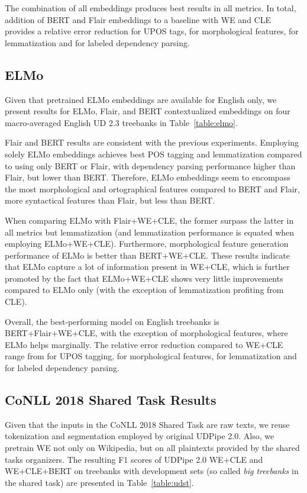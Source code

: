 \documentclass[11pt,a4paper]{article}
\begin{document}
The combination of all embeddings produces best results in all metrics.
In total, addition of BERT and Flair
embeddings to a baseline with WE and CLE provides a  relative error
reduction for UPOS tags,  for morphological features,  for
lemmatization and  for labeled dependency parsing.

\subsection{ELMo}

Given that pretrained ELMo embeddings are available for English only,
we present results for ELMo, Flair, and BERT contextualized embeddings on four
macro-averaged English UD 2.3 treebanks in Table~\ref{table:elmo}.


Flair and BERT results are consistent with the previous experiments.
Employing solely ELMo embeddings
achieves best POS tagging and lemmatization compared to using only BERT or Flair, with dependency
parsing performance higher than Flair, but lower than BERT. Therefore,
ELMo embeddings seem to encompass the most morphological and ortographical features
compared to BERT and Flair, more syntactical features than Flair, but less
than BERT.

When comparing ELMo with Flair+WE+CLE, the former surpass the latter in all
metrics but lemmatization (and lemmatization performance is equated when
employing ELMo+WE+CLE). Furthermore, morphological feature generation performance
of ELMo is better than BERT+WE+CLE. These results indicate that ELMo capture
a lot of information present in WE+CLE, which is further promoted
by the fact that ELMo+WE+CLE shows very little improvements compared to ELMo
only (with the exception of lemmatization profiting from CLE).

Overall, the best-performing model on English treebanks is
BERT+Flair+WE+CLE, with the exception of morphological features, where
ELMo helps marginally. The relative error reduction compared
to WE+CLE range from  for UPOS tagging,  for morphological features,
 for lemmatization and  for labeled dependency parsing.

\subsection{CoNLL 2018 Shared Task Results}

Given that the inputs in the CoNLL 2018 Shared Task are raw texts, we reuse
tokenization and segmentation employed by original UDPipe 2.0. Also, we
pretrain WE not only on Wikipedia, but on all plaintexts provided by the
shared tasks organizers. The resulting F1 scores of UDPipe 2.0 WE+CLE and WE+CLE+BERT
on treebanks with development sets (so called \emph{big treebanks} in the shared task)
are presented in Table~\ref{table:udst}.
\end{document}
